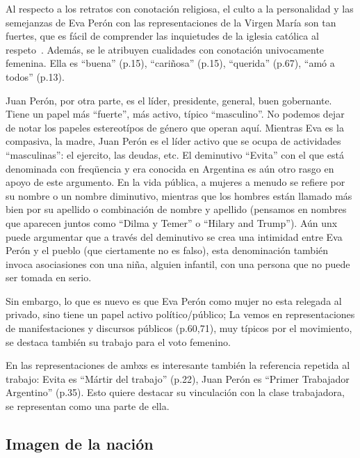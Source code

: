 Al respecto a los retratos con conotación religiosa, el culto a la personalidad y las semejanzas de Eva Perón con las representaciones de la Virgen María son tan fuertes, que es fácil de comprender las inquietudes de la iglesia católica al respeto~\autocite{Chamosa2010}.
Además, se le atribuyen cualidades con conotación univocamente femenina.
Ella es ``buena'' (p.15), ``cariñosa'' (p.15), ``querida'' (p.67), ``amó a todos'' (p.13).

Juan Perón, por otra parte, es el líder, presidente, general, buen gobernante.
Tiene un papel más ``fuerte'', más activo, típico ``masculino''.
No podemos dejar de notar los papeles estereotípos de género que operan aquí.
Mientras Eva es la compasiva, la madre, Juan Perón es el líder activo que se ocupa de actividades ``masculinas'': el ejercito, las deudas, etc.
El deminutivo ``Evita'' con el que está denominada con freqüencia y era conocida en Argentina es aún otro rasgo en apoyo de este argumento.
En la vida pública, a mujeres a menudo se refiere por su nombre o un nombre diminutivo, mientras que los hombres están llamado más bien por su apellido o combinación de nombre y apellido (pensamos en nombres que aparecen juntos como ``Dilma y Temer'' o ``Hilary and Trump'').
Aún unx puede argumentar que a través del deminutivo se crea una intimidad entre Eva Perón y el pueblo (que ciertamente no es falso),
esta denominación también invoca asociasiones con una niña, alguien infantil, con una persona que no puede ser tomada en serio.

Sin embargo, lo que es nuevo es que Eva Perón como mujer no esta relegada al privado, sino tiene un papel activo político/público;
La vemos en representaciones de manifestaciones y discursos públicos (p.60,71), muy típicos por el movimiento, se destaca también su trabajo para el voto femenino.

En las representaciones de ambxs es interesante también la referencia repetida al trabajo:
Evita es ``Mártir del trabajo'' (p.22),
Juan Perón es ``Primer Trabajador Argentino'' (p.35).
Esto quiere destacar su vinculación con la clase trabajadora, se representan como una parte de ella.


\subsection{Imagen de la nación}

